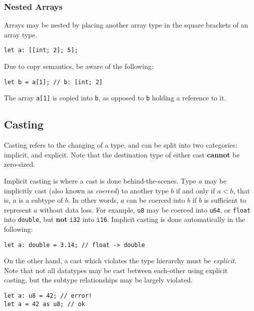 \subsubsection{Nested Arrays}

Arrays may be nested by placing another array type in the square brackets of an array type.

\begin{lstlisting}[language=CustomLang]
let a: [[int; 2]; 5];
\end{lstlisting}

Due to copy semantics, be aware of the following:

\begin{lstlisting}[language=CustomLang]
let b = a[1]; // b: [int; 2]
\end{lstlisting}

The array \texttt{a[1]} is copied into \texttt{b}, as opposed to \texttt{b} holding a reference to it.

\subsection{Casting}\label{subsec:type-casting}

Casting refers to the changing of a type, and can be split into two categories: implicit, and explicit.
Note that the destination type of either cast \textbf{cannot} be zero-sized.

Implicit casting is where a cast is done behind-the-scenes.
Type \(a\) may be implicitly cast (also known as \textit{coerced}) to another type \(b\) if and only if \(a < b\), that is, \(a\) is a subtype of \(b\).
In other words, \(a\) can be coerced into \(b\) if \(b\) is sufficient to represent \(a\) without data loss.
For example, \texttt{u8} may be coerced into \texttt{u64}, or \texttt{float} into \texttt{double}, but \textbf{not} \texttt{i32} into \texttt{i16}.
Implicit casting is done automatically in the following:

\begin{lstlisting}[language=CustomLang]
let a: double = 3.14; // float -> double
\end{lstlisting}

On the other hand, a cast which violates the type hierarchy must be \textit{explicit}.
Note that not all datatypes may be cast between each-other using explicit casting, but the subtype relationships may be largely violated.

\begin{lstlisting}[language=CustomLang]
let a: u8 = 42; // error!
let a = 42 as u8; // ok
\end{lstlisting}

